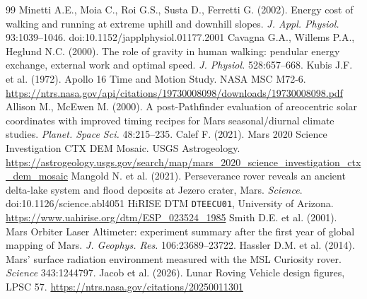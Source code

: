 \documentclass[11pt,a4paper]{article}
\renewcommand{\_}{\textunderscore\allowbreak}
\begin{document}
\begin{thebibliography}{99}\small
{} Minetti A.E., Moia C., Roi G.S., Susta D., Ferretti G. (2002). Energy cost of walking and running at extreme uphill and downhill slopes. \emph{J. Appl. Physiol.} 93:1039--1046. doi:10.1152/japplphysiol.01177.2001
 Cavagna G.A., Willems P.A., Heglund N.C. (2000). The role of gravity in human walking: pendular energy exchange, external work and optimal speed. \emph{J. Physiol.} 528:657--668.
 Kubis J.F. et al. (1972). Apollo 16 Time and Motion Study. NASA MSC M72-6. \url{https://ntrs.nasa.gov/api/citations/19730008098/downloads/19730008098.pdf}
 Allison M., McEwen M. (2000). A post-Pathfinder evaluation of areocentric solar coordinates with improved timing recipes for Mars seasonal/diurnal climate studies. \emph{Planet. Space Sci.} 48:215--235.
 Calef F. (2021). Mars 2020 Science Investigation CTX DEM Mosaic. USGS Astrogeology. \url{https://astrogeology.usgs.gov/search/map/mars_2020_science_investigation_ctx_dem_mosaic}
 Mangold N. et al. (2021). Perseverance rover reveals an ancient delta-lake system and flood deposits at Jezero crater, Mars. \emph{Science}. doi:10.1126/science.abl4051
 HiRISE DTM \texttt{DTEEC\_023524\_1985\_023379\_1985\_U01}, University of Arizona. \url{https://www.uahirise.org/dtm/ESP_023524_1985}
 Smith D.E. et al. (2001). Mars Orbiter Laser Altimeter: experiment summary after the first year of global mapping of Mars. \emph{J. Geophys. Res.} 106:23689--23722.
 Hassler D.M. et al. (2014). Mars' surface radiation environment measured with the MSL Curiosity rover. \emph{Science} 343:1244797.
 Jacob et al. (2026). Lunar Roving Vehicle design figures, LPSC 57. \url{https://ntrs.nasa.gov/citations/20250011301}
\end{thebibliography}
\end{document}
